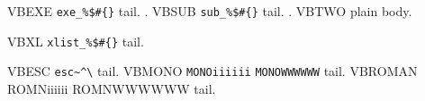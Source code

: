 

\begin{exe}
\ex VBEXE \verb|exe_%$#{}| tail.
\a. VBSUB \verb|sub_%$#{}| tail.
\z.
\ex VBTWO plain body.
 \begin{xlist}
 \ex VBXL \verb|xlist_%$#{}| tail.
 \end{xlist}
\ex VBESC \verb|esc~^\| tail.
\ex VBMONO \verb|MONOiiiiii| \verb|MONOWWWWWW| tail.
\ex VBROMAN \textrm{ROMNiiiiii} \textrm{ROMNWWWWWW} tail.
\end{exe}

